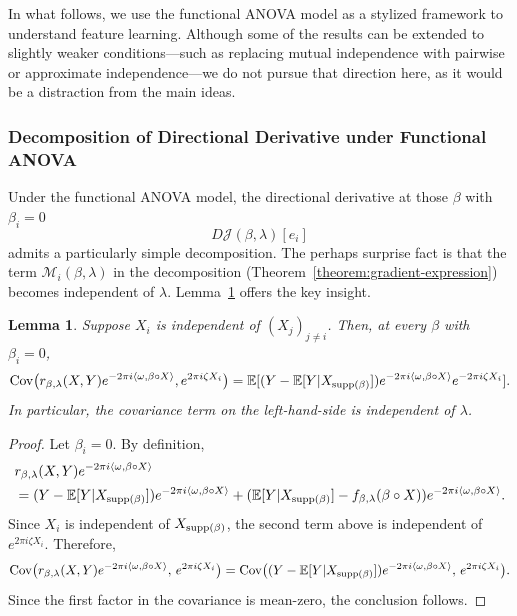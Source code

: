 \documentclass[sn-mathphys-num]{sn-jnl}%
\numberwithin{equation}{section}
\newcommand{\E}{\mathbb{E}}
\newtheorem{lemma}{Lemma}
\newcommand{\Cov}{{\rm Cov}}
\newcommand{\supp}{\mathop{\rm supp}}
\theoremstyle{thmstyleone}%
\theoremstyle{thmstyletwo}%
\theoremstyle{thmstylethree}%
\begin{document}
In what follows, we use the functional ANOVA model as a stylized framework to understand feature learning. 
Although some of the results can be extended to slightly weaker conditions---such as replacing mutual independence with pairwise or approximate independence---we do not pursue that direction here, as it would be a distraction from the main ideas.

\subsubsection{Decomposition of Directional Derivative under Functional ANOVA} 
Under the functional ANOVA model, the directional derivative at those $\beta$ with $\beta_i = 0$
\begin{equation*}
	 D \mathcal{J}(\beta, \lambda)[e_i] 
\end{equation*}
admits a particularly simple decomposition. The perhaps surprise fact is that the term $\mathcal{M}_i(\beta, \lambda)$ in the decomposition
(Theorem~\ref{theorem:gradient-expression}) becomes independent of $\lambda$. Lemma~\ref{lemma:stupid-term-in-S} offers the key insight. %

\begin{lemma}
\label{lemma:stupid-term-in-S}
Suppose  \( X_i \) is independent of \( (X_j)_{j \ne i} \). Then, at every $\beta$ with $\beta_i = 0$, 
\begin{equation*}
	\Cov\big(r_{\beta, \lambda}(X, Y) e^{-2\pi i \langle \omega, \beta \circ X \rangle}, e^{2\pi i \zeta X_i}\big) = 
		\E[(Y - \E[Y|X_{\supp(\beta)}]) e^{-2\pi i \langle \omega, \beta \circ X \rangle}  e^{-2\pi i \zeta X_i}].
\end{equation*}
In particular, the covariance term on the left-hand-side is independent of $\lambda$.
\end{lemma}
\begin{proof} 
Let $\beta_i = 0$. By definition, 
\begin{equation*}
\begin{split} 
&r_{\beta, \lambda}(X, Y) e^{-2\pi i \langle \omega, \beta \circ X \rangle} \\
& = (Y-  \E[Y|X_{\supp(\beta)}]) e^{-2\pi i \langle \omega, \beta \circ X \rangle} + 
			(\E[Y|X_{\supp(\beta)}] -  f_{\beta, \lambda}(\beta \circ X)) e^{-2\pi i \langle \omega, \beta \circ X \rangle}.
\end{split}
\end{equation*} 
Since $X_i$ is independent of $X_{\supp(\beta)}$, the second term above is independent of  \( e^{2\pi i \zeta X_i} \). Therefore,
\[
\Cov\big(r_{\beta, \lambda}(X, Y) e^{-2\pi i \langle \omega, \beta \circ X \rangle}, \, e^{2\pi i \zeta X_i}\big)
    = \Cov\big((Y-\E[Y|X_{\supp(\beta)}]) e^{-2\pi i \langle \omega, \beta \circ X \rangle}, \, e^{2\pi i \zeta X_i}\big).
\]
Since the first factor in the covariance is mean-zero, the conclusion follows. 
\end{proof} 
\end{document}
